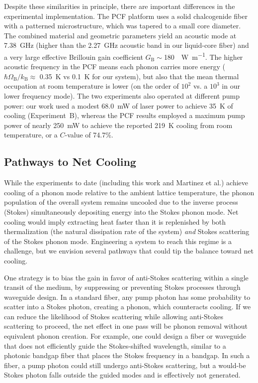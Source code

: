 Despite these similarities in principle, there are important differences in the experimental implementation. The \ac{PCF} platform uses a solid chalcogenide fiber with a patterned microstructure, which was tapered to a small core diameter. The combined material and geometric parameters yield an acoustic mode at \SI{7.38}{\giga\hertz} (higher than the \SI{2.27}{\giga\hertz} acoustic band in our liquid-core fiber) and a very large effective Brillouin gain coefficient \(G_{\mathrm{B}} \sim\)\SI{180}{\per\watt\per\meter}. The higher acoustic frequency in the \ac{PCF} means each phonon carries more energy (\(\hbar\Omega_{\mathrm{B}}/k_{\mathrm{B}} \approx\) \SI{0.35}{\kelvin} vs \SI{0.1}{\kelvin} for our system), but also that the mean thermal occupation at room temperature is lower (on the order of \(10^{2}\) vs. a \(10^{3}\) in our lower frequency mode). The two experiments also operated at different pump power: our work used a modest \SI{68.0}{\milli\watt} of laser power to achieve \SI{35}{\kelvin} of cooling (Experiment~B), whereas the \ac{PCF} results employed a maximum pump power of nearly \SI{250}{\milli\watt} to achieve the reported \SI{219}{\kelvin} cooling from room temperature, or a \(C\)-value of 74.7\%. \cite{blazquez2024optoacoustic}

\subsection{Pathways to Net Cooling}
\label{Cooling:subsec:PathwaystoNetCooling}

While the experiments to date (including this work and Martinez et al.) achieve cooling of a phonon mode relative to the ambient lattice temperature, the phonon population of the overall system remains uncooled due to the inverse process (Stokes) simultaneously depositing energy into the Stokes phonon mode. Net cooling would imply extracting heat faster than it is replenished by both thermalization (the natural dissipation rate of the system) \emph{and} Stokes scattering of the Stokes phonon mode. Engineering a system to reach this regime is a challenge, but we envision several pathways that could tip the balance toward net cooling.

One strategy is to bias the gain in favor of anti-Stokes scattering within a single transit of the medium, by suppressing or preventing Stokes processes through waveguide design. In a standard fiber, any pump photon has some probability to scatter into a Stokes photon, creating a phonon, which counteracts cooling. If we can reduce the likelihood of Stokes scattering while allowing anti-Stokes scattering to proceed, the net effect in one pass will be phonon removal without equivalent phonon creation. For example, one could design a fiber or waveguide that does not efficiently guide the Stokes-shifted wavelength, similar to a photonic bandgap fiber that places the Stokes frequency in a bandgap. In such a fiber, a pump photon could still undergo anti-Stokes scattering, but a would-be Stokes photon falls outside the guided modes and is effectively not generated.

